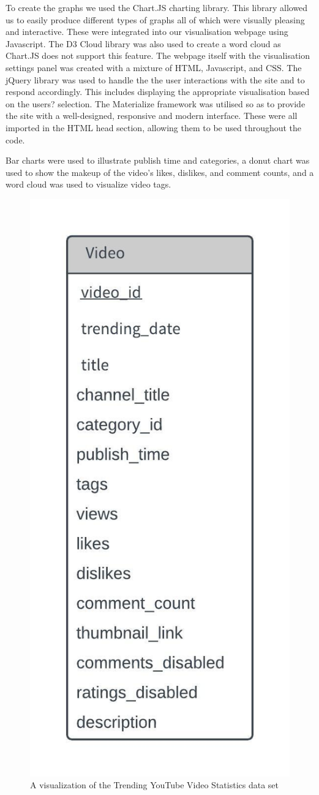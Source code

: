 \documentclass[journal]{vgtc}                %
\begin{document}
To create the graphs we used the Chart.JS charting library. This library allowed us to easily produce different types of graphs all of which were visually pleasing and interactive. These were integrated into our visualisation webpage using Javascript. The D3 Cloud library was also used to create a word cloud as Chart.JS does not support this feature. The webpage itself with the visualisation settings panel was created with a mixture of HTML, Javascript, and CSS. The jQuery library was used to handle the the user interactions with the site and to respond
accordingly. This includes displaying the appropriate visualisation based on the users? selection. The Materialize framework was utilised so as to provide the site with a well-designed, responsive and modern interface. These were all imported in the HTML head section, allowing them to be used throughout the code.

Bar charts were used to illustrate publish time and categories, a donut chart was used to show the makeup of the video's likes, dislikes, and comment counts, and a word cloud was used to visualize video tags. 

 

\begin{figure}[tb]
 \centering %
 \includegraphics[width=0.6\columnwidth]{erd}
 \caption{A visualization of the Trending YouTube Video Statistics data set}
 \label{fig:data}
\end{figure}
\end{document}
